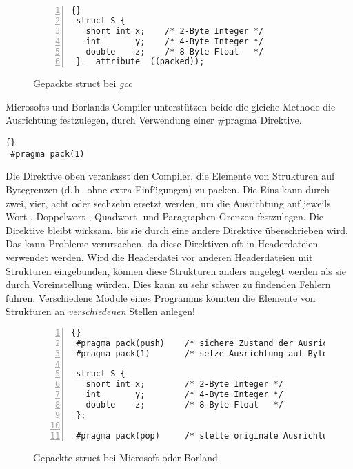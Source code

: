 \begin{figure}[th]
\begin{lstlisting}[frame=tlrb, numbers=left]{}
 struct S {
   short int x;    /* 2-Byte Integer */
   int       y;    /* 4-Byte Integer */
   double    z;    /* 8-Byte Float   */
 } __attribute__((packed));
\end{lstlisting}
\caption{Gepackte {\code struct} bei \emph{gcc}
\label{fig:packedStruct} }
\end{figure}

Microsofts  und Borlands
 Compiler unterst\"{u}tzen beide die gleiche
Methode die Ausrichtung festzulegen, durch Verwendung einer {\code
\#pragma} Direktive. 
\begin{lstlisting}[stepnumber=0]{}
 #pragma pack(1)
\end{lstlisting}
Die Direktive oben veranlasst den Compiler, die Elemente von
Strukturen auf Bytegrenzen (d.\,h.\ ohne extra Einf\"{u}gungen) zu
packen. Die Eins kann durch zwei, vier, acht oder sechzehn ersetzt
werden, um die Ausrichtung auf jeweils Wort-, Doppelwort-, Quadwort-
und Paragraphen-Grenzen festzulegen. Die Direktive bleibt wirksam,
bis sie durch eine andere Direktive \"{u}berschrieben wird. Das kann
Probleme verursachen, da diese Direktiven oft in Headerdateien
verwendet werden. Wird die Headerdatei vor anderen Headerdateien mit
Strukturen eingebunden, k\"{o}nnen diese Strukturen anders angelegt
werden als sie durch Voreinstellung w\"{u}rden. Dies kann zu sehr schwer
zu findenden Fehlern f\"{u}hren. Verschiedene Module eines Programms
k\"{o}nnten die Elemente von Strukturen an \emph{verschiedenen} Stellen
anlegen!

\begin{figure}[t]
\begin{lstlisting}[frame=tlrb, numbers=left]{}
 #pragma pack(push)    /* sichere Zustand der Ausrichtung */
 #pragma pack(1)       /* setze Ausrichtung auf Byte   */

 struct S {
   short int x;        /* 2-Byte Integer */
   int       y;        /* 4-Byte Integer */
   double    z;        /* 8-Byte Float   */
 };

 #pragma pack(pop)     /* stelle originale Ausrichtung wieder her */
\end{lstlisting}
\caption{Gepackte {\code struct} bei Microsoft oder Borland
\label{fig:msPacked} }
\end{figure}

